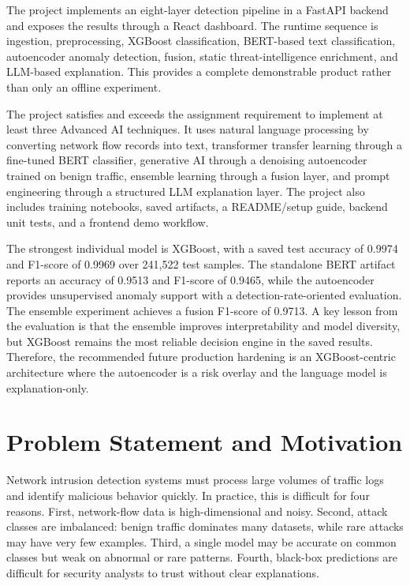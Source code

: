 \documentclass[12pt,a4paper]{article}
\begin{document}
The project implements an eight-layer detection pipeline in a FastAPI backend and exposes the results through a React dashboard. The runtime sequence is ingestion, preprocessing, XGBoost classification, BERT-based text classification, autoencoder anomaly detection, fusion, static threat-intelligence enrichment, and LLM-based explanation. This provides a complete demonstrable product rather than only an offline experiment.

The project satisfies and exceeds the assignment requirement to implement at least three Advanced AI techniques. It uses natural language processing by converting network flow records into text, transformer transfer learning through a fine-tuned BERT classifier, generative AI through a denoising autoencoder trained on benign traffic, ensemble learning through a fusion layer, and prompt engineering through a structured LLM explanation layer. The project also includes training notebooks, saved artifacts, a README/setup guide, backend unit tests, and a frontend demo workflow.

The strongest individual model is XGBoost, with a saved test accuracy of 0.9974 and F1-score of 0.9969 over 241,522 test samples. The standalone BERT artifact reports an accuracy of 0.9513 and F1-score of 0.9465, while the autoencoder provides unsupervised anomaly support with a detection-rate-oriented evaluation. The ensemble experiment achieves a fusion F1-score of 0.9713. A key lesson from the evaluation is that the ensemble improves interpretability and model diversity, but XGBoost remains the most reliable decision engine in the saved results. Therefore, the recommended future production hardening is an XGBoost-centric architecture where the autoencoder is a risk overlay and the language model is explanation-only.

\section{Problem Statement and Motivation}

Network intrusion detection systems must process large volumes of traffic logs and identify malicious behavior quickly. In practice, this is difficult for four reasons. First, network-flow data is high-dimensional and noisy. Second, attack classes are imbalanced: benign traffic dominates many datasets, while rare attacks may have very few examples. Third, a single model may be accurate on common classes but weak on abnormal or rare patterns. Fourth, black-box predictions are difficult for security analysts to trust without clear explanations.
\end{document}

